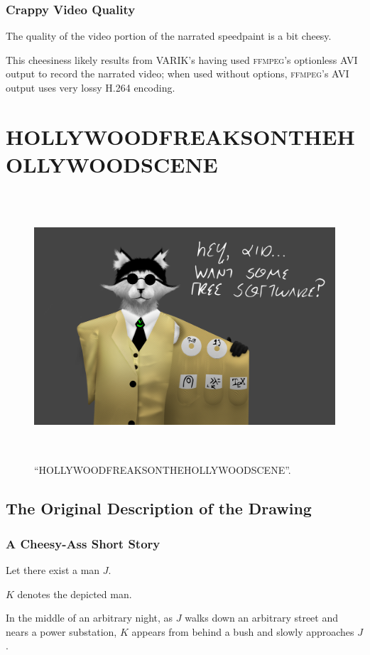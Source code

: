 \documentclass{report}
\newcommand\imageheight{10cm}
\begin{document}
\subsection{Crappy Video Quality}
The quality of the video portion of the narrated speedpaint is a bit cheesy.

This cheesiness likely results from VARIK's having used \textsc{ffmpeg}'s optionless AVI output to record the narrated video; when used without options, \textsc{ffmpeg}'s AVI output uses very lossy H.264 encoding.
\chapter{HOLLYWOODFREAKSONTHEHOLLYWOODSCENE}
\begin{figure}[ht]
	\centering
	\includegraphics[height=\imageheight]{hollywoodfreaksonthehollywoodscene/hollywoodfreaksonthehollywoodscene.png}
	\caption[center]{``HOLLYWOODFREAKSONTHEHOLLYWOODSCENE''.}
\end{figure}
\section{The Original Description of the Drawing}
\subsection{A Cheesy-Ass Short Story}
Let there exist a man $J$.

$K$ denotes the depicted man.

In the middle of an arbitrary night, as $J$ walks down an arbitrary street and nears a power substation, $K$ appears from behind a bush and slowly approaches $J$.
\end{document}
